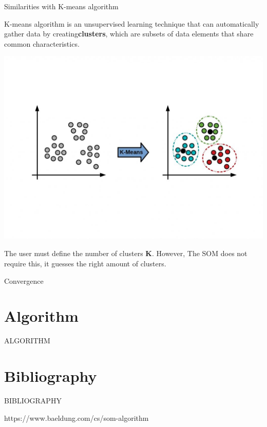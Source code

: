 \documentclass{beamer}
\begin{document}
	
	\begin{frame}{Similarities with K-means algorithm}
		
		K-means algorithm is an unsupervised learning technique that can automatically gather data by creating\textbf{clusters}, which are subsets of data elements that share common characteristics.

		\begin{center}
		
			\includegraphics[width=0.6\linewidth]{pics/kmeans.jpeg}
		\end{center}
			
		The user must define the number of clusters \textbf{K}. However, The SOM does not require this, it guesses the right amount of clusters.

	\end{frame}

	
	\begin{frame}{Convergence}
	
	\end{frame}



\section{Algorithm}

	\begin{frame}
	
		\begin{center}
			
			\Huge ALGORITHM
		\end{center}
	\end{frame}










\section{Bibliography}
	
	\begin{frame}
	
		\begin{center}

			\Huge BIBLIOGRAPHY
		\end{center}
	\end{frame}


	\begin{frame}
	
https://www.baeldung.com/cs/som-algorithm
	\end{frame}
\end{document}
